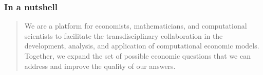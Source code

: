 \begin{frame}\frametitle{In a nutshell}

\begin{quote}
	We are a platform for economists, mathematicians, and computational scientists to facilitate the transdisciplinary collaboration in the development, analysis, and application of computational economic models. Together, we expand the set of possible economic questions that we can address and improve the quality of our	answers.
\end{quote}

\end{frame}


